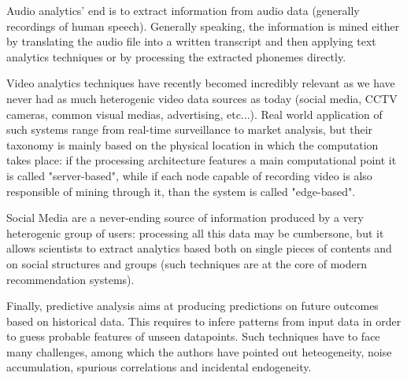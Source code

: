\documentclass{article}
\begin{document}
Audio analytics' end is to extract information from audio data (generally recordings of human speech). Generally speaking, the information is mined either by translating the audio file into a written transcript and then applying text analytics techniques or by processing the extracted phonemes directly.

Video analytics techniques have recently becomed incredibly relevant as we have never had as much heterogenic video data sources as today (social media, CCTV cameras, common visual medias, advertising, etc...). Real world application of such systems range from real-time surveillance to market analysis, but their taxonomy is mainly based on the physical location in which the computation takes place: if the processing architecture features a main computational point it is called "server-based", while if each node capable of recording video is also responsible of mining through it, than the system is called "edge-based".

Social Media are a never-ending source of information produced by a very heterogenic group of users: processing all this data may be cumbersone, but it allows scientists to extract analytics based both on single pieces of contents and on social structures and groups (such techniques are at the core of modern recommendation systems).

Finally, predictive analysis aims at producing predictions on future outcomes based on historical data. This requires to infere patterns from input data in order to guess probable features of unseen datapoints. Such techniques have to face many challenges, among which the authors have pointed out heteogeneity, noise accumulation, spurious correlations and incidental endogeneity.
\end{document}

